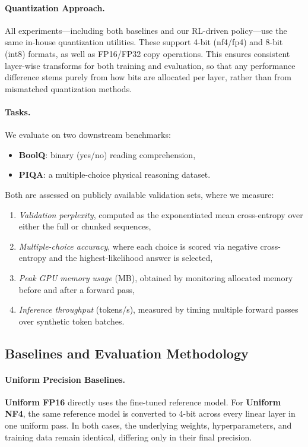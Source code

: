 \documentclass{article}
\begin{document}
	\paragraph{Quantization Approach.}
	All experiments---including both baselines and our RL-driven policy---use the same in-house quantization utilities. These support 4-bit (nf4/fp4) and 8-bit (int8) formats, as well as FP16/FP32 copy operations. This ensures consistent layer-wise transforms for both training and evaluation, so that any performance difference stems purely from how bits are allocated per layer, rather than from mismatched quantization methods.
	
	\paragraph{Tasks.}
	We evaluate on two downstream benchmarks:
	\begin{itemize}
		\item \textbf{BoolQ}: binary (yes/no) reading comprehension,
		\item \textbf{PIQA}: a multiple-choice physical reasoning dataset.
	\end{itemize}
	Both are assessed on publicly available validation sets, where we measure:
	\begin{enumerate}
		\item \emph{Validation perplexity}, computed as the exponentiated mean cross-entropy over either the full or chunked sequences,
		\item \emph{Multiple-choice accuracy}, where each choice is scored via negative cross-entropy and the highest-likelihood answer is selected,
		\item \emph{Peak GPU memory usage} (MB), obtained by monitoring allocated memory before and after a forward pass,
		\item \emph{Inference throughput} (tokens/s), measured by timing multiple forward passes over synthetic token batches.
	\end{enumerate}
	
	\subsection{Baselines and Evaluation Methodology}
	
	\paragraph{Uniform Precision Baselines.}
	\textbf{Uniform FP16} directly uses the fine-tuned reference model. For \textbf{Uniform NF4}, the same reference model is converted to 4-bit across every linear layer in one uniform pass. In both cases, the underlying weights, hyperparameters, and training data remain identical, differing only in their final precision.
	
\end{document}
